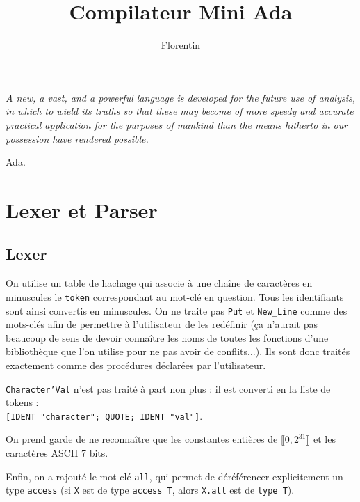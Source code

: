 \documentclass[a4paper, 10pt, french]{article}
\title{Compilateur Mini Ada}
\author{Florentin \bsc{Guth}}
\newcommand{\codeAda}[1]{\texttt{#1}}
\newcommand{\codeOCaml}[1]{\texttt{#1}}
\newcommand{\code}[1]{\texttt{#1}}
\begin{document}
\maketitle

\begin{table}[h]
  \parbox{.3\linewidth}{}
  \hfill
  \parbox{.7\linewidth}{
    \begin{flushright}
      \emph{A new, a vast, and a powerful language is developed for the future use of analysis, in which to wield its truths so that these may become of more speedy and accurate practical application for the purposes of mankind than the means hitherto in our possession have rendered possible.}
      
      Ada.
    \end{flushright}}
\end{table}

\tableofcontents


\clearpage
\section{Lexer et Parser}

\subsection{Lexer}

On utilise un table de hachage qui associe à une chaîne de caractères en minuscules le \code{token} correspondant au mot-clé en question. Tous les identifiants sont ainsi convertis en minuscules. On ne traite pas \codeAda{Put} et \codeAda{New_Line} comme des mots-clés afin de permettre à l'utilisateur de les redéfinir (ça n'aurait pas beaucoup de sens de devoir connaître les noms de toutes les fonctions d'une bibliothèque que l'on utilise pour ne pas avoir de conflits...). Ils sont donc traités exactement comme des procédures déclarées par l'utilisateur.

\codeAda{Character'Val} n'est pas traité à part non plus : il est converti en la liste de tokens :\\
\codeOCaml{[IDENT "character"; QUOTE; IDENT "val"]}.

On prend garde de ne reconnaître que les constantes entières de $\llbracket 0, 2^{31} \rrbracket$ et les caractères ASCII 7 bits.

Enfin, on a rajouté le mot-clé \codeAda{all}, qui permet de déréférencer explicitement un type \codeAda{access} (si \codeAda{X} est de type \codeAda{access T}, alors \codeAda{X.all} est de \codeAda{type T}).
\end{document}
